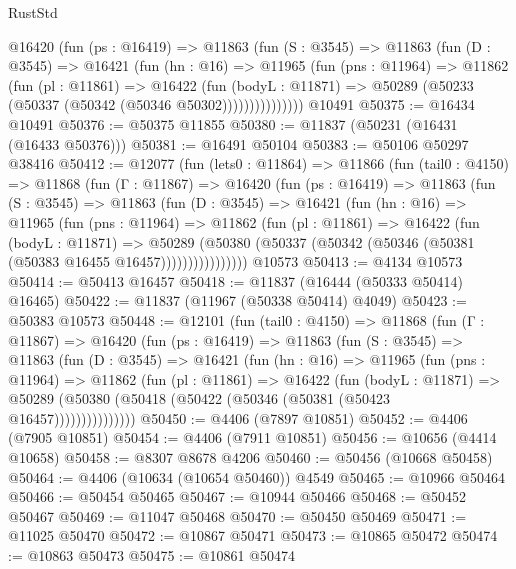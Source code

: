 \begin{lexlean}{RustStd}
\begin{coremodule}
{\begin{coremodule}
{{{{{{{{{{{{{{{{{{{{{{{{{{{{{{{{{{{{{{{{{{{{{{{{{{          @16420
            (fun (ps : @16419) =>
            @11863
              (fun (S : @3545) =>
              @11863
                (fun (D : @3545) =>
                @16421
                  (fun (hn : @16) =>
                  @11965
                    (fun (pns : @11964) =>
                    @11862
                      (fun (pl : @11861) =>
                      @16422
                        (fun (bodyL : @11871) =>
                        @50289 (@50233 (@50337 (@50342 (@50346 @50302)))))))))))))))
    @10491
@50375 := @16434 @10491
@50376 := @50375 @11855
@50380 := @11837 (@50231 (@16431 (@16433 @50376)))
@50381 := @16491 @50104
@50383 := @50106 @50297 @38416
@50412 := @12077
    (fun (lets0 : @11864) =>
    @11866
      (fun (tail0 : @4150) =>
      @11868
        (fun (Γ : @11867) =>
        @16420
          (fun (ps : @16419) =>
          @11863
            (fun (S : @3545) =>
            @11863
              (fun (D : @3545) =>
              @16421
                (fun (hn : @16) =>
                @11965
                  (fun (pns : @11964) =>
                  @11862
                    (fun (pl : @11861) =>
                    @16422
                      (fun (bodyL : @11871) =>
                      @50289
                        (@50380
                          (@50337 (@50342 (@50346 (@50381 (@50383 @16455 @16457))))))))))))))))
    @10573
@50413 := @4134 @10573
@50414 := @50413 @16457
@50418 := @11837 (@16444 (@50333 @50414) @16465)
@50422 := @11837 (@11967 (@50338 @50414) @4049)
@50423 := @50383 @10573
@50448 := @12101
    (fun (tail0 : @4150) =>
    @11868
      (fun (Γ : @11867) =>
      @16420
        (fun (ps : @16419) =>
        @11863
          (fun (S : @3545) =>
          @11863
            (fun (D : @3545) =>
            @16421
              (fun (hn : @16) =>
              @11965
                (fun (pns : @11964) =>
                @11862
                  (fun (pl : @11861) =>
                  @16422
                    (fun (bodyL : @11871) =>
                    @50289 (@50380 (@50418 (@50422 (@50346 (@50381 (@50423 @16457)))))))))))))))
@50450 := @4406 (@7897 @10851)
@50452 := @4406 (@7905 @10851)
@50454 := @4406 (@7911 @10851)
@50456 := @10656 (@4414 @10658)
@50458 := @8307 @8678 @4206
@50460 := @50456 (@10668 @50458)
@50464 := @4406 (@10634 (@10654 @50460)) @4549
@50465 := @10966 @50464
@50466 := @50454 @50465
@50467 := @10944 @50466
@50468 := @50452 @50467
@50469 := @11047 @50468
@50470 := @50450 @50469
@50471 := @11025 @50470
@50472 := @10867 @50471
@50473 := @10865 @50472
@50474 := @10863 @50473
@50475 := @10861 @50474
}}}}}}}}}}}}}}}}}}}}}}}}}}}}}}}}}}}}}}}}}}}}}}}}}}
\end{coremodule}}
\end{coremodule}
\end{lexlean}

